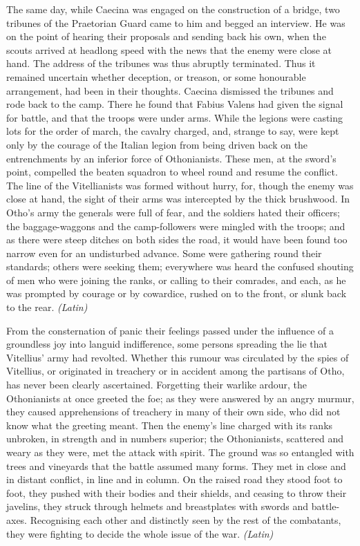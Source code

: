 The same day, while Caecina was engaged on the construction of a bridge, two tribunes of the Praetorian Guard came to him and begged an interview. He was on the point of hearing their proposals and sending back his own, when the scouts arrived at headlong speed with the news that the enemy were close at hand. The address of the tribunes was thus abruptly terminated. Thus it remained uncertain whether deception, or treason, or some honourable arrangement, had been in their thoughts. Caecina dismissed the tribunes and rode back to the camp. There he found that Fabius Valens had given the signal for battle, and that the troops were under arms. While the legions were casting lots for the order of march, the cavalry charged, and, strange to say, were kept only by the courage of the Italian legion from being driven back on the entrenchments by an inferior force of Othonianists. These men, at the sword's point, compelled the beaten squadron to wheel round and resume the conflict. The line of the Vitellianists was formed without hurry, for, though the enemy was close at hand, the sight of their arms was intercepted by the thick brushwood. In Otho's army the generals were full of fear, and the soldiers hated their officers; the baggage-waggons and the camp-followers were mingled with the troops; and as there were steep ditches on both sides the road, it would have been found too narrow even for an undisturbed advance. Some were gathering round their standards; others were seeking them; everywhere was heard the confused shouting of men who were joining the ranks, or calling to their comrades, and each, as he was prompted by courage or by cowardice, rushed on to the front, or slunk back to the rear. \emph{(Latin)}


From the consternation of panic their feelings passed under the influence of a groundless joy into languid indifference, some persons spreading the lie that Vitellius' army had revolted. Whether this rumour was circulated by the spies of Vitellius, or originated in treachery or in accident among the partisans of Otho, has never been clearly ascertained. Forgetting their warlike ardour, the Othonianists at once greeted the foe; as they were answered by an angry murmur, they caused apprehensions of treachery in many of their own side, who did not know what the greeting meant. Then the enemy's line charged with its ranks unbroken, in strength and in numbers superior; the Othonianists, scattered and weary as they were, met the attack with spirit. The ground was so entangled with trees and vineyards that the battle assumed many forms. They met in close and in distant conflict, in line and in column. On the raised road they stood foot to foot, they pushed with their bodies and their shields, and ceasing to throw their javelins, they struck through helmets and breastplates with swords and battle-axes. Recognising each other and distinctly seen by the rest of the combatants, they were fighting to decide the whole issue of the war. \emph{(Latin)}

